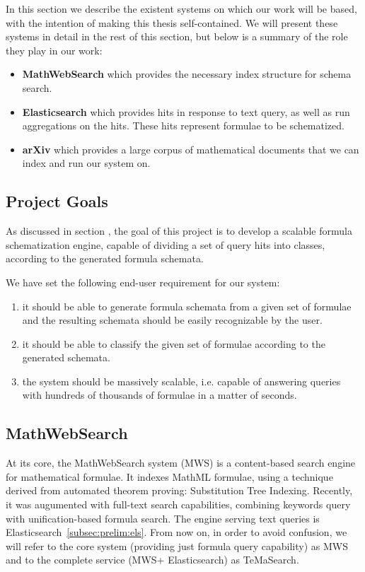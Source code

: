 \documentclass[a4paper,11pt,oneside]{article}
\def\MWS{\textsf{MWS}\xspace}
\def\mws{\textsf{MathWebSearch}\xspace}
\def\tms{\textsf{TeMaSearch}\xspace}
\def\els{\textsf{Elasticsearch}\xspace}
\begin{document}
In this section we describe the existent systems on which our work will be
based, with the intention of making this thesis self-contained. We will
present these systems in detail in the rest of this section, but
below is a summary of the role they play in our work:
\begin{itemize}
\item \textbf{MathWebSearch} which provides the necessary index structure
for schema search.
\item \textbf{Elasticsearch} which provides hits in response to text query,
    as well as run aggregations on the hits.
    These hits represent formulae to be schematized.
\item \textbf{arXiv} which provides a large corpus of mathematical documents
    that we can index and run our system on.
\end{itemize}

\subsection{Project Goals}\label{subsec:prelim:goals}
As discussed in section \label{sec:intro}, the goal of this project is to
develop a scalable formula schematization engine, capable of dividing a set of
query hits into classes, according to the generated formula schemata.

We have set the following end-user requirement for our system:
\begin{enumerate}
    \item it should be able to generate formula schemata from a
        given set of formulae and the resulting schemata should be easily
        recognizable by the user.
    \item it should be able to classify the given set of formulae according to
        the generated schemata.
    \item the system should be massively scalable, i.e. capable of answering
        queries with hundreds of thousands of formulae in a matter of seconds.
\end{enumerate}

\subsection{MathWebSearch}\label{subsec:prelim:mws}

At its core, the \mws system (MWS) is a content-based search engine for
mathematical formulae. It indexes MathML formulae, using a technique derived
from automated theorem proving: Substitution Tree Indexing.
Recently, it was augumented with full-text search capabilities, combining
keywords query with unification-based formula search. The engine serving
text queries is \els~\ref{subsec:prelim:els}.
From now on, in order to avoid confusion, we will refer to the core system
(providing just formula query capability) as \MWS and to the complete service
(\MWS + \els) as \tms.
\end{document}
